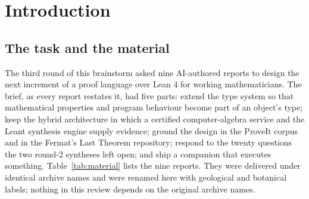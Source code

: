\documentclass[11pt,a4paper]{article}
\theoremstyle{definition}
\begin{document}
\begingroup\small\setlength{\parskip}{0pt}\tableofcontents\endgroup
\clearpage

\section{Introduction}\label{sec:intro}

\subsection{The task and the material}\label{sec:material}
The third round of this brainstorm asked nine AI-authored reports to design the next increment of a proof language over Lean 4 for working mathematicians. The brief, as every report restates it, had five parts: extend the type system so that mathematical properties and program behaviour become part of an object's type; keep the hybrid architecture in which a certified computer-algebra service and the Leant synthesis engine supply evidence; ground the design in the ProveIt corpus and in the Fermat's Last Theorem repository; respond to the twenty questions the two round-2 syntheses left open; and ship a companion that executes something. Table~\ref{tab:material} lists the nine reports. They were delivered under identical archive names and were renamed here with geological and botanical labels; nothing in this review depends on the original archive names.
\end{document}
